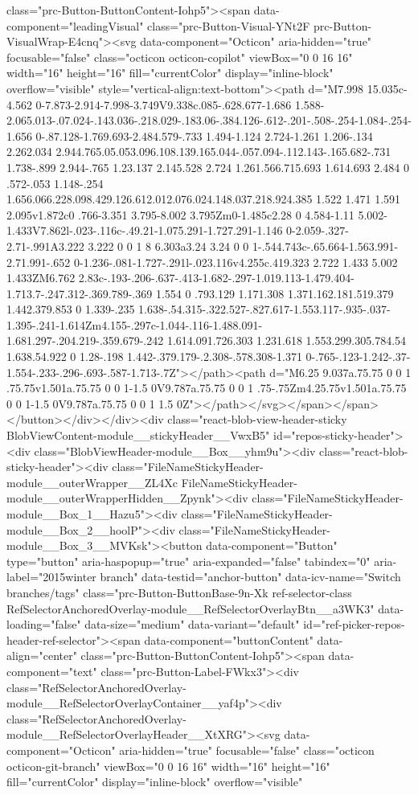 {{{{{class="prc-Button-ButtonContent-Iohp5"><span data-component="leadingVisual" class="prc-Button-Visual-YNt2F prc-Button-VisualWrap-E4cnq"><svg data-component="Octicon" aria-hidden="true" focusable="false" class="octicon octicon-copilot" viewBox="0 0 16 16" width="16" height="16" fill="currentColor" display="inline-block" overflow="visible" style="vertical-align:text-bottom"><path d="M7.998 15.035c-4.562 0-7.873-2.914-7.998-3.749V9.338c.085-.628.677-1.686 1.588-2.065.013-.07.024-.143.036-.218.029-.183.06-.384.126-.612-.201-.508-.254-1.084-.254-1.656 0-.87.128-1.769.693-2.484.579-.733 1.494-1.124 2.724-1.261 1.206-.134 2.262.034 2.944.765.05.053.096.108.139.165.044-.057.094-.112.143-.165.682-.731 1.738-.899 2.944-.765 1.23.137 2.145.528 2.724 1.261.566.715.693 1.614.693 2.484 0 .572-.053 1.148-.254 1.656.066.228.098.429.126.612.012.076.024.148.037.218.924.385 1.522 1.471 1.591 2.095v1.872c0 .766-3.351 3.795-8.002 3.795Zm0-1.485c2.28 0 4.584-1.11 5.002-1.433V7.862l-.023-.116c-.49.21-1.075.291-1.727.291-1.146 0-2.059-.327-2.71-.991A3.222 3.222 0 0 1 8 6.303a3.24 3.24 0 0 1-.544.743c-.65.664-1.563.991-2.71.991-.652 0-1.236-.081-1.727-.291l-.023.116v4.255c.419.323 2.722 1.433 5.002 1.433ZM6.762 2.83c-.193-.206-.637-.413-1.682-.297-1.019.113-1.479.404-1.713.7-.247.312-.369.789-.369 1.554 0 .793.129 1.171.308 1.371.162.181.519.379 1.442.379.853 0 1.339-.235 1.638-.54.315-.322.527-.827.617-1.553.117-.935-.037-1.395-.241-1.614Zm4.155-.297c-1.044-.116-1.488.091-1.681.297-.204.219-.359.679-.242 1.614.091.726.303 1.231.618 1.553.299.305.784.54 1.638.54.922 0 1.28-.198 1.442-.379.179-.2.308-.578.308-1.371 0-.765-.123-1.242-.37-1.554-.233-.296-.693-.587-1.713-.7Z"></path><path d="M6.25 9.037a.75.75 0 0 1 .75.75v1.501a.75.75 0 0 1-1.5 0V9.787a.75.75 0 0 1 .75-.75Zm4.25.75v1.501a.75.75 0 0 1-1.5 0V9.787a.75.75 0 0 1 1.5 0Z"></path></svg></span></span></button></div></div><div class="react-blob-view-header-sticky BlobViewContent-module__stickyHeader__VwxB5" id="repos-sticky-header"><div class="BlobViewHeader-module__Box__yhm9u"><div class="react-blob-sticky-header"><div class="FileNameStickyHeader-module__outerWrapper__ZL4Xc FileNameStickyHeader-module__outerWrapperHidden__Zpynk"><div class="FileNameStickyHeader-module__Box_1__Hazu5"><div class="FileNameStickyHeader-module__Box_2__hoolP"><div class="FileNameStickyHeader-module__Box_3__MVKsk"><button data-component="Button" type="button" aria-haspopup="true" aria-expanded="false" tabindex="0" aria-label="2015winter branch" data-testid="anchor-button" data-icv-name="Switch branches/tags" class="prc-Button-ButtonBase-9n-Xk ref-selector-class RefSelectorAnchoredOverlay-module__RefSelectorOverlayBtn__a3WK3" data-loading="false" data-size="medium" data-variant="default" id="ref-picker-repos-header-ref-selector"><span data-component="buttonContent" data-align="center" class="prc-Button-ButtonContent-Iohp5"><span data-component="text" class="prc-Button-Label-FWkx3"><div class="RefSelectorAnchoredOverlay-module__RefSelectorOverlayContainer__yaf4p"><div class="RefSelectorAnchoredOverlay-module__RefSelectorOverlayHeader__XtXRG"><svg data-component="Octicon" aria-hidden="true" focusable="false" class="octicon octicon-git-branch" viewBox="0 0 16 16" width="16" height="16" fill="currentColor" display="inline-block" overflow="visible" }}}}}
